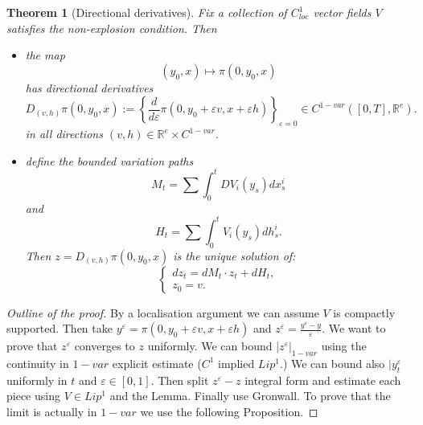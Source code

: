 \documentclass{article}
\newcommand{\R}{\mathbb{R}}
\newtheorem{theorem}{Theorem}
\begin{document}
\begin{theorem}[Directional derivatives]\label{theo:directionalRS}
    Fix a collection of $C^1_{loc}$ vector fields $V$ satisfies the non-explosion condition.
    Then
    \begin{itemize}
        \item the map
        \begin{equation}
            (y_0, x) \mapsto \pi(0, y_0, x) 
        \end{equation}
        has directional derivatives
        \begin{equation}
            D_{(v,h)}\pi(0,y_0,x) := \left\{ \frac{d}{d\varepsilon} \pi(0, y_0 + \varepsilon v, x + \varepsilon h) \right\}_{\varepsilon = 0} \in C^{1-var}([0,T], \R^e).
        \end{equation}
        in all directions $(v,h) \in \R^e \times C^{1-var}$.
        \item define the bounded variation paths
        \begin{equation}
            M_t = \sum \int_0^t DV_i(y_s) dx^i_s
        \end{equation}
        and 
        \begin{equation}
            H_t = \sum \int_0^t V_i(y_s) dh^i_s.
        \end{equation}
        Then $z = D_{(v,h)}\pi(0,y_0,x)$ is the unique solution of:
        \begin{equation}
            \begin{cases}
                dz_t = dM_t \cdot z_t + dH_t,\\
                z_0 = v.
            \end{cases}
        \end{equation}
    \end{itemize}
\end{theorem}
\begin{proof}[Outline of the proof]
    By a localisation argument we can assume $V$ is compactly supported.
    Then take $y^\varepsilon = \pi(0, y_0 + \varepsilon v, x + \varepsilon h)$ and $z^\varepsilon = \frac{y^\varepsilon - y}{\varepsilon}.$
    We want to prove that $z^\varepsilon$ converges to $z$ uniformly.
    We can bound $|z^\varepsilon|_{1-var}$ using the continuity in $1-var$ explicit estimate ($C^1$ implied $Lip^1.$)
    We can bound also $|y_t^\varepsilon$ uniformly in $t$ and $\varepsilon \in [0,1].$
    Then split $z^\varepsilon - z$ integral form and estimate each piece using $V \in Lip^1$ and the Lemma.
    Finally use Gronwall.
    To prove that the limit is actually in $1-var$ we use the following Proposition.
\end{proof}
\end{document}
